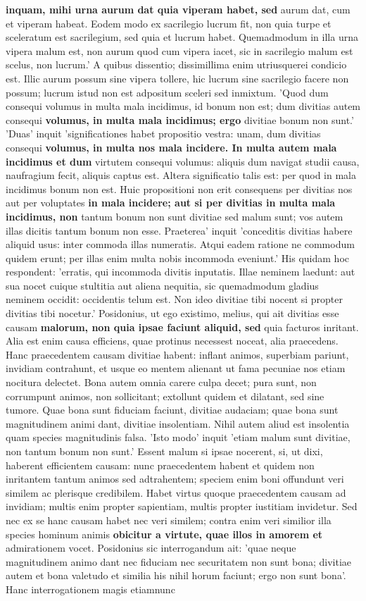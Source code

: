 \textbf{inquam, mihi urna aurum dat quia viperam habet, sed} aurum dat, cum et viperam habeat. Eodem modo ex sacrilegio lucrum fit, non quia turpe et sceleratum est sacrilegium, sed quia et lucrum habet. Quemadmodum in illa urna vipera malum est, non aurum quod cum vipera iacet, sic in sacrilegio malum est scelus, non lucrum.' A quibus dissentio; dissimillima enim utriusquerei condicio est. Illic aurum possum sine vipera tollere, hic lucrum sine sacrilegio facere non possum; lucrum istud non est adpositum sceleri sed inmixtum. 'Quod dum consequi volumus in multa mala incidimus, id bonum non est; dum divitias autem consequi \textbf{volumus, in multa mala incidimus; ergo} divitiae bonum non sunt.' 'Duas' inquit 'significationes habet propositio vestra: unam, dum divitias consequi \textbf{volumus, in multa nos mala \textbf{\textbf{incidere. In} multa autem mala incidimus et} dum} virtutem consequi volumus: aliquis dum navigat studii causa, naufragium fecit, aliquis captus est. Altera significatio talis est: per quod in mala incidimus bonum non est. Huic propositioni non erit consequens per divitias nos aut per voluptates \textbf{in mala incidere; aut \textbf{si per \textbf{divitias in} multa mala incidimus, non}} tantum bonum non sunt divitiae sed malum sunt; vos autem illas dicitis tantum bonum non esse. Praeterea' inquit 'conceditis divitias habere aliquid usus: inter commoda illas numeratis. Atqui eadem ratione ne commodum quidem erunt; per illas enim multa nobis incommoda eveniunt.' His quidam hoc respondent: 'erratis, qui incommoda divitis inputatis. Illae neminem laedunt: aut sua nocet cuique stultitia aut aliena nequitia, sic quemadmodum gladius neminem occidit: occidentis telum est. Non ideo divitiae tibi nocent si propter divitias tibi nocetur.' Posidonius, ut ego existimo, melius, qui ait divitias esse causam \textbf{malorum, non quia ipsae faciunt aliquid, sed} quia facturos inritant. Alia est enim causa efficiens, quae protinus necessest noceat, alia praecedens. Hanc praecedentem causam divitiae habent: inflant animos, superbiam pariunt, invidiam contrahunt, et usque eo mentem alienant ut fama pecuniae nos etiam nocitura delectet. Bona autem omnia carere culpa decet; pura sunt, non corrumpunt animos, non sollicitant; extollunt quidem et dilatant, sed sine tumore. Quae bona sunt fiduciam faciunt, divitiae audaciam; quae bona sunt magnitudinem animi dant, divitiae insolentiam. Nihil autem aliud est insolentia quam species magnitudinis falsa. 'Isto modo' inquit 'etiam malum sunt divitiae, non tantum bonum non sunt.' Essent malum si ipsae nocerent, si, ut dixi, haberent efficientem causam: nunc praecedentem habent et quidem non inritantem tantum animos sed adtrahentem; speciem enim boni offundunt veri similem ac plerisque credibilem. Habet virtus quoque praecedentem causam ad invidiam; multis enim propter sapientiam, multis propter iustitiam invidetur. Sed nec ex se hanc causam habet nec veri similem; contra enim veri similior illa species hominum animis \textbf{\textbf{obicitur a virtute, quae illos in amorem} et} admirationem vocet. Posidonius sic interrogandum ait: 'quae neque magnitudinem animo dant nec fiduciam nec securitatem non sunt bona; divitiae autem et bona valetudo et similia his nihil horum faciunt; ergo non sunt bona'. Hanc interrogationem magis etiamnunc 